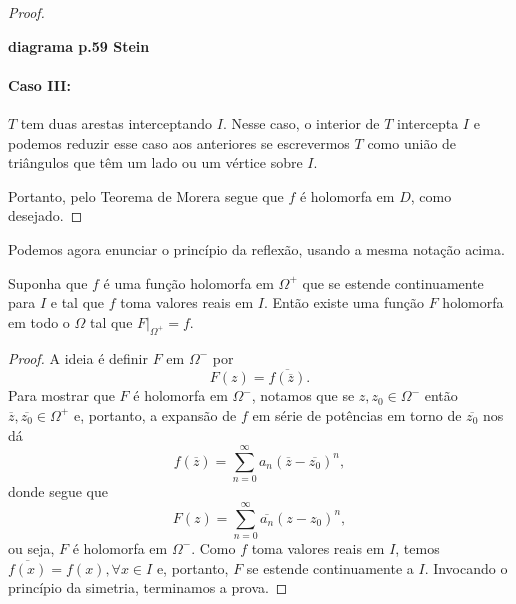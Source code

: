 \begin{proof}
        \begin{center}
            \textbf{diagrama p.59 Stein}
        \end{center}
        
        \paragraph{Caso III:} $T$ tem duas arestas interceptando $I$. Nesse caso, o interior
        de $T$ intercepta $I$ e podemos reduzir esse caso aos anteriores se escrevermos $T$
        como união de triângulos que têm um lado ou um vértice sobre $I$.
        
        Portanto, pelo Teorema de Morera segue que $f$ é holomorfa em $D$, como desejado.
    \end{proof}
    
    Podemos agora enunciar o princípio da reflexão, usando a mesma notação acima.
    
    \begin{teorema}
    \label{teo-reflexao-schwarz}
        Suponha que $f$ é uma função holomorfa em $\Omega^+$ que se estende continuamente 
        para $I$ e tal que $f$ toma valores reais em $I$. Então existe uma função $F$
        holomorfa em todo o $\Omega$ tal que $F\big|_{\Omega^+} = f$.
    \end{teorema}
        
    \begin{proof}
        A ideia é definir $F$ em $\Omega^-$ por
        \begin{equation*}
            F(z) = \overline{f(\overline{z})} .
        \end{equation*}
        Para mostrar que $F$ é holomorfa em $\Omega^-$, notamos que se $z, z_0\in\Omega^-$
        então $\overline{z}, \overline{z_0}\in\Omega^+$ e, portanto, a expansão de $f$
        em série de potências em torno de $\overline{z_0}$ nos dá
        \begin{equation*}
            f(\overline{z}) = \sum_{n=0}^{\infty} a_n (\overline{z} - \overline{z_0})^n,
        \end{equation*}
        donde segue que
        \begin{equation*}
            F(z) = \sum_{n=0}^{\infty} \overline{a_n} (z - z_0)^n,
        \end{equation*}
        ou seja, $F$ é holomorfa em $\Omega^-$. Como $f$ toma valores reais em $I$, temos
        $\overline{f(x)} = f(x), \forall x\in I$ e, portanto, $F$ se estende continuamente
        a $I$. Invocando o princípio da simetria, terminamos a prova.
    \end{proof}
%

